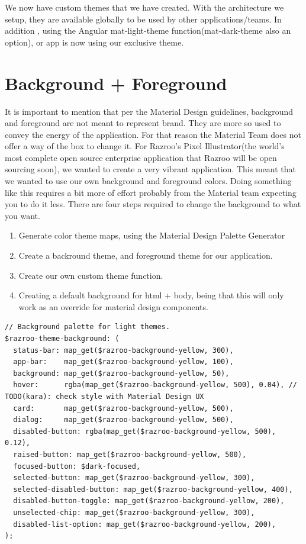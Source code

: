 We now have custom themes that we have created. With the architecture we setup,
they are available globally to be used by other applications/teams. In addition
, using the Angular mat-light-theme function(mat-dark-theme also an option), 
or app is now using our exclusive theme. 

\section{Background + Foreground}
It is important to mention that per the Material Design guidelines, background
and foreground are not meant to represent brand. They are more so used to 
convey the energy of the application. For that reason the Material Team does 
not offer a way of the box to change it. For Razroo's Pixel Illustrator(the world's most 
complete open source enterprise application that Razroo will be open sourcing 
soon), we wanted to create a very vibrant application. This meant that we 
wanted to use our own background and foreground colors. Doing something like
this requires a bit more of effort probably from the Material team expecting 
you to do it less. There are four steps required to change the background to 
what you want. 

\begin{enumerate}
  \item Generate color theme maps, using the Material Design Palette Generator
  \item Create a backround theme, and foreground theme for our application.
  \item Create our own custom theme function.
  \item Creating a default background for html + body, being that this will 
  only work as an override for material design components. 
\end{enumerate}

\begin{lstlisting}[caption=Example of what a custom background theme looks like.]
// Background palette for light themes.
$razroo-theme-background: (
  status-bar: map_get($razroo-background-yellow, 300),
  app-bar:    map_get($razroo-background-yellow, 100),
  background: map_get($razroo-background-yellow, 50),
  hover:      rgba(map_get($razroo-background-yellow, 500), 0.04), // TODO(kara): check style with Material Design UX
  card:       map_get($razroo-background-yellow, 500),
  dialog:     map_get($razroo-background-yellow, 500),
  disabled-button: rgba(map_get($razroo-background-yellow, 500), 0.12),
  raised-button: map_get($razroo-background-yellow, 500),
  focused-button: $dark-focused,
  selected-button: map_get($razroo-background-yellow, 300),
  selected-disabled-button: map_get($razroo-background-yellow, 400),
  disabled-button-toggle: map_get($razroo-background-yellow, 200),
  unselected-chip: map_get($razroo-background-yellow, 300),
  disabled-list-option: map_get($razroo-background-yellow, 200),
);
\end{lstlisting}


